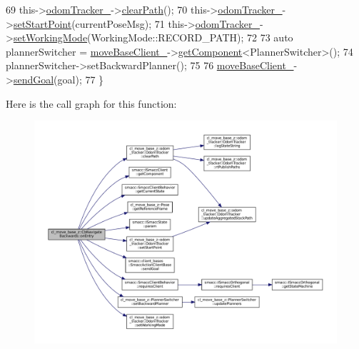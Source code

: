 \begin{DoxyCode}
69     this->\hyperlink{classcl__move__base__z_1_1CbNavigateBackwards_a75a8ae7aef6c72e96f4037c4941b0341}{odomTracker\_}->\hyperlink{classcl__move__base__z_1_1odom__tracker_1_1OdomTracker_a93a14e15e3e623f530e056f403bf7644}{clearPath}();
70     this->\hyperlink{classcl__move__base__z_1_1CbNavigateBackwards_a75a8ae7aef6c72e96f4037c4941b0341}{odomTracker\_}->\hyperlink{classcl__move__base__z_1_1odom__tracker_1_1OdomTracker_a9f4989c6353022c2ec3b0546c09bf3bc}{setStartPoint}(currentPoseMsg);
71     this->\hyperlink{classcl__move__base__z_1_1CbNavigateBackwards_a75a8ae7aef6c72e96f4037c4941b0341}{odomTracker\_}->\hyperlink{classcl__move__base__z_1_1odom__tracker_1_1OdomTracker_aeed01bdefd9a1cc709b0b3e4eed285ed}{setWorkingMode}(WorkingMode::RECORD\_PATH);
72 
73     \textcolor{keyword}{auto} plannerSwitcher = \hyperlink{classcl__move__base__z_1_1CbNavigateBackwards_a943c1a790eac9266adf11fbdc078f03a}{moveBaseClient\_}->\hyperlink{classsmacc_1_1ISmaccClient_adef78db601749ca63c19e74a27cb88cc}{getComponent}<PlannerSwitcher>();
74     plannerSwitcher->setBackwardPlanner();
75 
76     \hyperlink{classcl__move__base__z_1_1CbNavigateBackwards_a943c1a790eac9266adf11fbdc078f03a}{moveBaseClient\_}->\hyperlink{classsmacc_1_1client__bases_1_1SmaccActionClientBase_a9c47a5094ac8afb01680307fe5eca922}{sendGoal}(goal);
77 \}
\end{DoxyCode}
Here is the call graph for this function\+:
\nopagebreak
\begin{figure}[H]
\begin{center}
\leavevmode
\includegraphics[width=350pt]{classcl__move__base__z_1_1CbNavigateBackwards_a545a5282f0ef6b0080b46002d6037567_cgraph}
\end{center}
\end{figure}
\mbox{\label{classcl__move__base__z_1_1CbNavigateBackwards_a92858e20e6401051203f5dfa4aef60dc}} 
